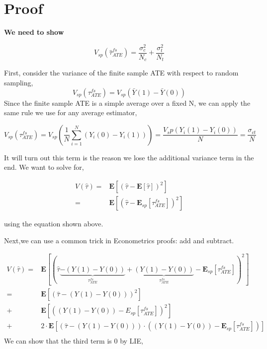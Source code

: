 \documentclass[
  letterpaper,
  DIV=11,
  numbers=noendperiod]{scrreprt}
\theoremstyle{definition}
\theoremstyle{remark}
\begin{document}
\section{Proof}\label{proof-3}

\begin{tcolorbox}[enhanced jigsaw, bottomrule=.15mm, arc=.35mm, toprule=.15mm, breakable, left=2mm, colframe=quarto-callout-important-color-frame, leftrule=.75mm, colback=white, rightrule=.15mm, opacityback=0]

\vspace{-3mm}\textbf{We need to show}\vspace{3mm}

\[
V_{sp}(\hat{\tau}_{ATE}^{fs})=\frac{\sigma_c^2}{N_c}+\frac{\sigma_t^2}{N_t}
\]

\end{tcolorbox}

First, consider the variance of the finite sample ATE with respect to
random sampling, \[
V_{sp}(\tau_{ATE}^{fs})=V_{sp}(\bar{Y}(1)-\bar{Y}(0))
\] Since the finite sample ATE is a simple average over a fixed N, we
can apply the same rule we use for any average estimator,

\[
V_{sp}(\tau_{ATE}^{fs})=V_{sp}(\frac{1}{N}\sum_{i=1}^N(Y_i(0)-Y_i(1)))=\frac{V_sp(Y_i(1)-Y_i(0))}{N}=\frac{\sigma_{ct}}{N}
\]

It will turn out this term is the reason we lose the additional variance
term in the end. We want to solve for,

\[
\begin{align}
V(\hat{\tau}) =& \mathbf{E}[(\hat{\tau}-\mathbf{E}[\hat{\tau}])^2] \\
=& \mathbf{E}[(\hat{\tau}-\mathbf{E}_{sp}[\tau_{ATE}^{fs}])^2]
\end{align}
\]

using the equation shown above.

Next,we can use a common trick in Econometrics proofs: add and subtract.

\[
\begin{align}
V(\hat{\tau}) = & \mathbf{E}[(\hat{\tau}\underbrace{- (Y(1) - Y(0))}_{\tau_{ATE}^{fs}} + \underbrace{(Y(1) - Y(0))}_{\tau_{ATE}^{fs}} - \mathbf{E}_{sp}[\tau_{ATE}^{fs}] )^2] \\
= & \mathbf{E} [ (\hat{\tau} - (Y(1) - Y(0)))^2 ] \\
+ & \mathbf{E} [ ((Y(1) - Y(0)) - E_{sp}[\tau_{ATE}^{fs}])^2] \\
+ & 2 \cdot \mathbf{E}[ (\hat{\tau} - (Y(1) - Y(0)))\cdot((Y(1) - Y(0)) - \mathbf{E}_{sp}[\tau_{ATE}^{fs}] )] \\
\end{align}
\] We can show that the third term is 0 by LIE,
\end{document}
